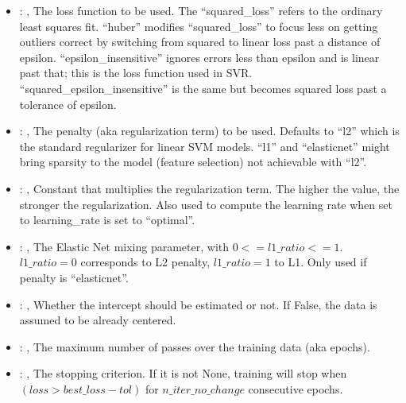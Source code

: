 \begin{itemize}
    \item {}: , 
      The loss function to be used.                                                  The
      ``squared\_loss'' refers to the ordinary least squares fit. ``huber'' modifies
      ``squared\_loss'' to focus less on getting outliers correct by
      switching from squared to linear loss past a distance of epsilon. ``epsilon\_insensitive''
      ignores errors less than epsilon and is linear past
      that; this is the loss function used in SVR. ``squared\_epsilon\_insensitive'' is the same but
      becomes squared loss past a tolerance of epsilon.

    \item {}: \xmlDesc{[l2, l1, elasticnet]}, 
      The penalty (aka regularization term) to be used. Defaults to ``l2'' which is the standard
      regularizer for linear SVM models.                                                  ``l1'' and
      ``elasticnet'' might bring sparsity to the model (feature selection) not achievable with
      ``l2''.

    \item {}: , 
      Constant that multiplies the regularization term. The higher the value, the stronger the
      regularization. Also used to compute                                                  the
      learning rate when set to learning\_rate is set to ``optimal''.

    \item {}: , 
      The Elastic Net mixing parameter, with $0 <= l1\_ratio <= 1$. $l1\_ratio=0$ corresponds to L2
      penalty, $l1\_ratio=1$ to L1.                                                  Only used if
      penalty is ``elasticnet''.

    \item {}: , 
      Whether the intercept should be estimated or not. If False,
      the data is assumed to be already centered.

    \item {}: , 
      The maximum number of passes over the training data (aka epochs).

    \item {}: , 
      The stopping criterion. If it is not None, training will stop when $(loss > best\_loss - tol)$
      for $n\_iter\_no\_change$                                                  consecutive epochs.


\end{itemize}
